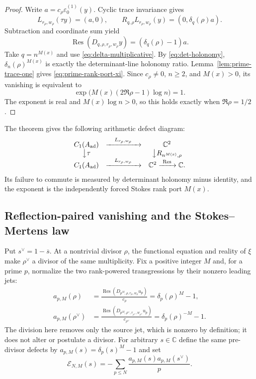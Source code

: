 \documentclass[11pt,a4paper]{amsart}
\theoremstyle{plain}
\theoremstyle{definition}
\newcommand{\CC}{\mathbb C}
\begin{document}
\begin{proof}
Write $a=c_\rho\varepsilon_0^{(1)}(y)$.  Cyclic trace invariance gives
\[
 L_{r_\rho,w_\rho}(\tau y)=(a,0),\qquad
 R_{q,\rho}L_{r_\rho,w_\rho}(y)=(0,\delta_q(\rho)a).
\]
Subtraction and coordinate sum yield
\[
 \operatorname{Res}(D_{q,\rho,r_\rho,w_\rho}y)
       =(\delta_q(\rho)-1)a.
\]
Take $q=n^{M(x)}$ and use \eqref{eq:delta-multiplicative}.  By
\eqref{eq:det-holonomy}, $\delta_n(\rho)^{M(x)}$ is exactly the determinant-line holonomy ratio.
Lemma~\ref{lem:prime-trace-one} gives \eqref{eq:prime-rank-port-xi}.  Since $c_\rho\ne0$,
$n\geq2$, and $M(x)>0$, its vanishing is equivalent to
\[
 \exp\bigl(M(x)(2\Re\rho-1)\log n\bigr)=1.
\]
The exponent is real and $M(x)\log n>0$, so this holds exactly when $\Re\rho=1/2$.
\end{proof}

The theorem gives the following arithmetic defect diagram:
\[
\begin{array}{ccc}
 C_1(A_{\rm ad})&\xrightarrow{\quad L_{r_\rho,w_\rho}\quad}&\CC^2\\
 \big\downarrow{\tau}&&\big\downarrow{R_{n^{M(x)},\rho}}\\
 C_1(A_{\rm ad})&\xrightarrow{\quad L_{r_\rho,w_\rho}\quad}&\CC^2
 \xrightarrow{\ \operatorname{Res}\ }\CC .
\end{array}
\]
Its failure to commute is measured by determinant holonomy minus identity, and the exponent is
the independently forced Stokes rank port $M(x)$.

\subsection{Reflection-paired vanishing and the Stokes--Mertens law}

Put $s^\vee=1-\overline s$.  At a nontrivial divisor $\rho$, the functional equation and reality
of $\xi$ make $\rho^\vee$ a divisor of the same multiplicity.  Fix a positive integer $M$ and,
for a prime $p$, normalize the two rank-powered transgressions by their nonzero leading jets:
\begin{equation}\label{eq:normalized-reflected-defects}
 \begin{aligned}
 a_{p,M}(\rho)
  &=\frac{\operatorname{Res}(D_{p^M,\rho,r_\rho,w_\rho}u_p)}{c_\rho}
    =\delta_p(\rho)^M-1,\\
 a_{p,M}(\rho^\vee)
  &=\frac{\operatorname{Res}
      (D_{p^M,\rho^\vee,r_{\rho^\vee},w_{\rho^\vee}}u_p)}{c_{\rho^\vee}}
    =\delta_p(\rho)^{-M}-1.
 \end{aligned}
\end{equation}
The division here removes only the source jet, which is nonzero by definition; it does not alter
or postulate a divisor.  For arbitrary $s\in\CC$ define the same pre-divisor defects by
$a_{p,M}(s)=\delta_p(s)^M-1$ and set
\begin{equation}\label{eq:stokes-prime-energy}
 \mathcal E_{N,M}(s)
   =-\sum_{p\leq N}\frac{a_{p,M}(s)a_{p,M}(s^\vee)}p.
\end{equation}
\end{document}
